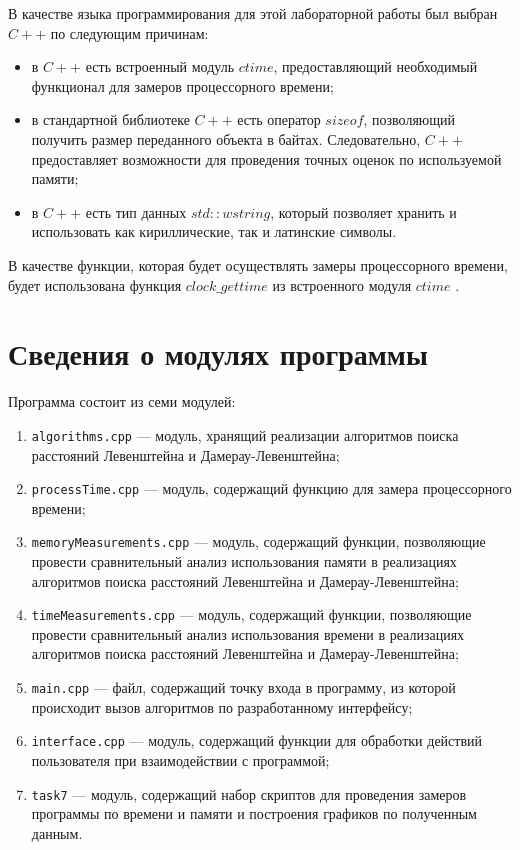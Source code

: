 В качестве языка программирования для этой лабораторной работы был выбран $C++$ \cite{pl} по следующим причинам:

\begin{itemize}[label=--]
	\item в $C++$ есть встроенный модуль $ctime$, предоставляющий необходимый функционал для замеров процессорного времени;
	\item в стандартной библиотеке $C++$ есть оператор $sizeof$, позволяющий получить размер переданного объекта в байтах. Следовательно, $C++$ предоставляет возможности для проведения точных оценок по используемой памяти;
	\item в $C++$ есть тип данных $std::wstring$, который позволяет хранить и использовать как кириллические, так и латинские символы.
\end{itemize}

В качестве функции, которая будет осуществлять замеры процессорного времени, будет использована функция $clock\_gettime$ из встроенного модуля $ctime$ \cite{cpu_time_func}.

\section{Сведения о модулях программы}

Программа состоит из семи модулей: 

\begin{enumerate}[label={\arabic*)}]
	\item \texttt{algorithms.cpp} --- модуль, хранящий реализации алгоритмов поиска расстояний Левенштейна и Дамерау-Левенштейна;
	\item \texttt{processTime.cpp} --- модуль, содержащий функцию для замера процессорного времени;
	\item \texttt{memoryMeasurements.cpp} --- модуль, содержащий функции, позволяющие провести сравнительный анализ использования памяти в реализациях алгоритмов поиска расстояний Левенштейна и Дамерау-Левенштейна;
	\item \texttt{timeMeasurements.cpp} --- модуль, содержащий функции, позволяющие провести сравнительный анализ использования времени в реализациях алгоритмов поиска расстояний Левенштейна и Дамерау-Левенштейна;
	\item \texttt{main.cpp} --- файл, содержащий точку входа в программу, из которой происходит вызов алгоритмов по разработанному интерфейсу;
	\item \texttt{interface.cpp} --- модуль, содержащий функции для обработки действий пользователя при взаимодействии с программой;
	\item \texttt{task7} --- модуль, содержащий набор скриптов для проведения замеров программы по времени и памяти и построения графиков по полученным данным.
\end{enumerate}

